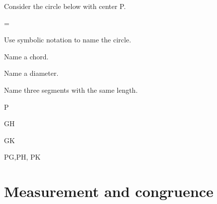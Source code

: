 \begin{exercises}
	\medskip
	
	\begin{ex}
	
	\e Consider the circle below with center \pnt P.\\
	
	\noindent
	\begin{minipage}{0.3\linewidth}
	
	\end{minipage}	
	\begin{minipage}{0.7\linewidth}
	\begin{exparts} \itemsep = \smallskipamount
	\item Use symbolic notation to name the circle.
	\item Name a chord.
	\item Name a diameter.
	\item Name three segments with the same length.
	\end{exparts}
	\end{minipage}
	
	\begin{sol}
		\hspace*{\fill}
		\begin{exparts}
		\item \cir P
		\item \seg GH
		\item \seg GK
		\item \seg PG,\seg PH, \seg PK
		\end{exparts}
	\end{sol}
	\end{ex}
	
	\medskip
		
\end{exercises}

			\section{Measurement and congruence}

